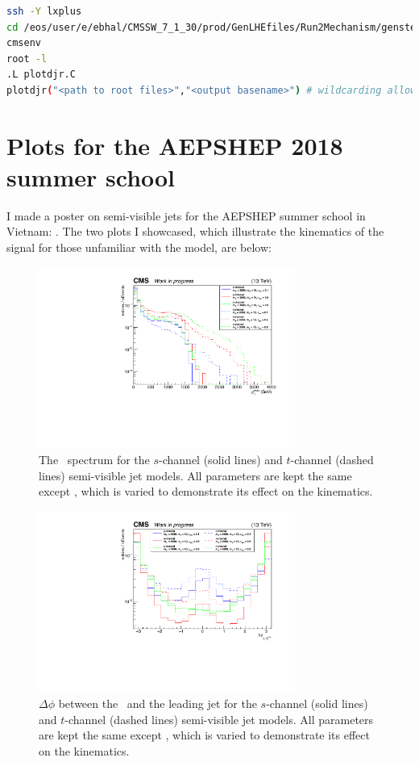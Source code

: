 \begin{lstlisting}[belowskip=-0.7cm, language=sh, numbers=none]
ssh -Y lxplus
cd /eos/user/e/ebhal/CMSSW_7_1_30/prod/GenLHEfiles/Run2Mechanism/genstep
cmsenv
root -l
.L plotdjr.C
plotdjr("<path to root files>","<output basename>") # wildcarding allowed for root files
\end{lstlisting}


\section{Plots for the AEPSHEP 2018 summer school}

I made a poster on semi-visible jets for the AEPSHEP summer school in Vietnam: %
. The two plots I showcased, which illustrate the kinematics of the signal for those unfamiliar with the model, are below:

\begin{figure}[H]
\centering
\includegraphics[width=0.75\textwidth]{./sec35/AEPSHEP/MET.pdf}
\caption{The \ptmiss\ spectrum for the $s$-channel (solid lines) and $t$-channel (dashed lines) semi-visible jet models. All parameters are kept the same except \rinv, which is varied to demonstrate its effect on the kinematics.}
\end{figure}

\begin{figure}[H]
\centering
\includegraphics[width=0.75\textwidth]{./sec35/AEPSHEP/dPhiMetJ.pdf}
\caption{$\Delta\phi$ between the \ptmiss\ and the leading jet for the $s$-channel (solid lines) and $t$-channel (dashed lines) semi-visible jet models. All parameters are kept the same except \rinv, which is varied to demonstrate its effect on the kinematics.}
\end{figure}

